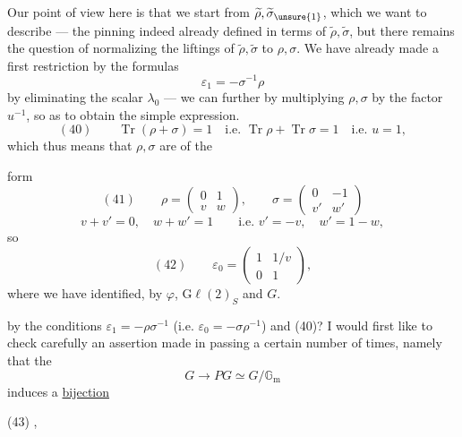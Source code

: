 
Our point of view here is that we start from $\widetilde\rho,\widetilde\sigma_{\unsure{1}}$, which we want to describe --- the pinning  indeed already defined in terms of $\widetilde\rho,\widetilde\sigma$, but there remains the question of normalizing the liftings of $\widetilde\rho,\widetilde\sigma$ to $\rho,\sigma$. We have already made a first restriction by the formulas
\[
\varepsilon_1=-\sigma^{-1}\rho
\]
by eliminating the scalar  $\lambda_0$ --- we can  further by multiplying $\rho,\sigma$ by the factor $u^{-1}$, so as to obtain the simple expression.
\[
(40)\qquad\operatorname{Tr}(\rho+\sigma)=1\quad\text{i.e. }\operatorname{Tr}\rho+\operatorname{Tr}\sigma=1\quad\text{i.e. }u=1,
\]
which thus means that $\rho,\sigma$ are of the



form
\[
(41)\qquad \rho=\begin{pmatrix}0&1\\v&w\end{pmatrix},\qquad
\sigma=\begin{pmatrix}0&-1\\v'&w'\end{pmatrix}
\]
\[
v+v'=0,\quad w+w'=1\qquad\text{i.e. }v'=-v,\quad w'=1-w,
\]
so
\[
(42)\qquad\varepsilon_0=\begin{pmatrix}1&1/v\\0&1\end{pmatrix},
\]
where we have identified, by $\varphi$, $\mathrm{G}\ell(2)_S$ and $G$.

 by the conditions $\varepsilon_1=-\rho\sigma^{-1}$ (i.e. $\varepsilon_0=-\sigma\rho^{-1}$) and (40)?
I would first like to check carefully an assertion made in passing a certain number of times, namely that the  
\[
G\longrightarrow PG\simeq G/\mathbb G_{\mathrm m}
\]
induces a \uline{bijection}

(43)\quad
{},

